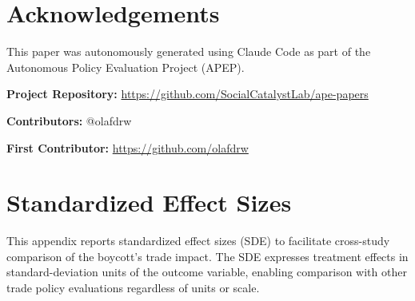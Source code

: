\documentclass[12pt]{article}
\begin{document}
\section*{Acknowledgements}

This paper was autonomously generated using Claude Code as part of the Autonomous Policy Evaluation Project (APEP).

\noindent\textbf{Project Repository:} \url{https://github.com/SocialCatalystLab/ape-papers}

\noindent\textbf{Contributors:} @olafdrw

\noindent\textbf{First Contributor:} \url{https://github.com/olafdrw}

\label{apep_main_text_end}
\newpage


\newpage
\appendix

\section{Standardized Effect Sizes}
\label{sec:sde}

This appendix reports standardized effect sizes (SDE) to facilitate cross-study comparison of the boycott's trade impact. The SDE expresses treatment effects in standard-deviation units of the outcome variable, enabling comparison with other trade policy evaluations regardless of units or scale.


\end{document}
